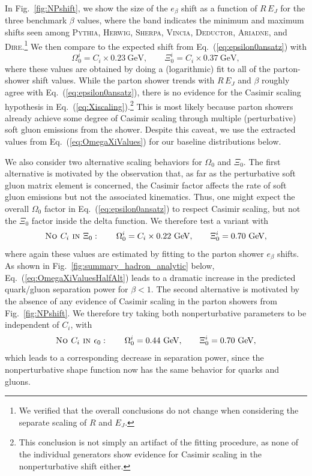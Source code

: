 \documentclass[11pt,letterpaper]{article}
\newcommand{\GeV}{\text{GeV}}
\DeclareRobustCommand{\Fig}[1]{Fig.~\ref{#1}}
\DeclareRobustCommand{\Eq}[1]{Eq.~(\ref{#1})}
\newcommand{\be}{\begin{equation}}
\newcommand{\ee}{\end{equation}}
\begin{document}
In \Fig{fig:NPshift}, we show the size of the $e_\beta$ shift as a function of $R \, E_J$ for the three benchmark $\beta$ values, where the band indicates the minimum and maximum shifts seen among \textsc{Pythia}, \textsc{Herwig}, \textsc{Sherpa}, \textsc{Vincia}, \textsc{Deductor}, \textsc{Ariadne}, and \textsc{Dire}.\footnote{We verified that the overall conclusions do not change when considering the separate scaling of $R$ and $E_J$.}  We then compare to the expected shift from \Eq{eq:epsilon0ansatz} with 
\be
\label{eq:OmegaXiValues}
\Omega^i_0 = C_i \times 0.23~\GeV, \qquad \Xi^i_0 = C_i \times
0.37~\GeV, \ee where these values are obtained by doing a
(logarithmic) fit to all of the parton-shower shift values.  While the
parton shower trends with $R \, E_J$ and $\beta$ roughly agree with
\Eq{eq:epsilon0ansatz}, there is no evidence for the Casimir scaling
hypothesis in \Eq{eq:Xiscaling}.\footnote{This conclusion is not
  simply an artifact of the fitting procedure, as none of the
  individual generators show evidence for Casimir scaling in the
  nonperturbative shift either.}  This is most likely because parton
showers already achieve some degree of Casimir scaling through
multiple (perturbative) soft gluon emissions from the shower. Despite
this caveat, we use the extracted values from \Eq{eq:OmegaXiValues}
for our baseline distributions below.

We also consider two alternative scaling behaviors for $\Omega_0$ and $\Xi_0$.  The first alternative is motivated by the observation that, as far as the perturbative soft gluon matrix element is concerned, the Casimir factor affects the rate of soft gluon emissions but not the associated kinematics.  Thus, one might expect the overall $\Omega_0$ factor in \Eq{eq:epsilon0ansatz} to respect Casimir scaling, but not the $\Xi_0$ factor inside the delta function.  We therefore test a variant with
\be
\label{eq:OmegaXiValuesHalfAlt}
\text{\textsc{No $C_i$ in $\Xi_0$}}:  \qquad \Omega^i_0 = C_i \times 0.22~\GeV, \qquad \Xi^i_0 = 0.70~\GeV,
\ee
where again these values are estimated by fitting to the parton shower $e_\beta$ shifts.  As shown in \Fig{fig:summary_hadron_analytic} below, \Eq{eq:OmegaXiValuesHalfAlt} leads to a dramatic increase in the predicted quark/gluon separation power for $\beta < 1$.  The second alternative is motivated by the absence of any evidence of Casimir scaling in the parton showers from \Fig{fig:NPshift}.  We therefore try taking both nonperturbative parameters to be independent of $C_i$, with
\be
\label{eq:OmegaXiValuesAlt}
\text{\textsc{No $C_i$ in $\epsilon_0$}}:  \qquad \Omega^i_0 = 0.44~\GeV, \qquad \Xi^i_0 = 0.70~\GeV,
\ee
which leads to a corresponding decrease in separation power, since the nonperturbative shape function now has the same behavior for quarks and gluons.
\end{document}
